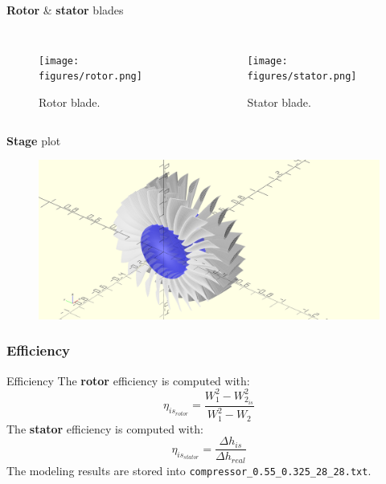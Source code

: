 	\begin{frame}{\textbf{Rotor} \& \textbf{stator} blades}
		\begin{columns}
				\begin{figure}
					\hspace{-2cm}
					\texttt{[image: figures/rotor.png]}
					\caption{Rotor blade.}
				\end{figure}
				\begin{figure}
					\hspace{-2cm}
					\texttt{[image: figures/stator.png]}
					\caption{Stator blade.}
				\end{figure}
		\end{columns}
	\end{frame}
	\begin{frame}{\textbf{Stage} plot}
		\begin{figure}
			\centering
			\includegraphics[width=1\textwidth]{figures/compressor.png}
		\end{figure}
	\end{frame}
\subsubsection{Efficiency}
	\begin{frame}[fragile]{Efficiency}
		The \textbf{rotor} efficiency is computed with:
		\begin{equation}
			\eta_{is_{rotor}} = \frac{W_1^2 - W_{2_{is}}^2}{W_1^2 - W_{2}} \nonumber 
		\end{equation}
		The \textbf{stator} efficiency is computed with:
		\begin{equation}
			\eta_{is_{stator}} = \frac{\Delta h_{is}}{\Delta h_{real}}
			\nonumber 
		\end{equation}
		The modeling results are stored into \verb|compressor_0.55_0.325_28_28.txt|.
	\end{frame}
